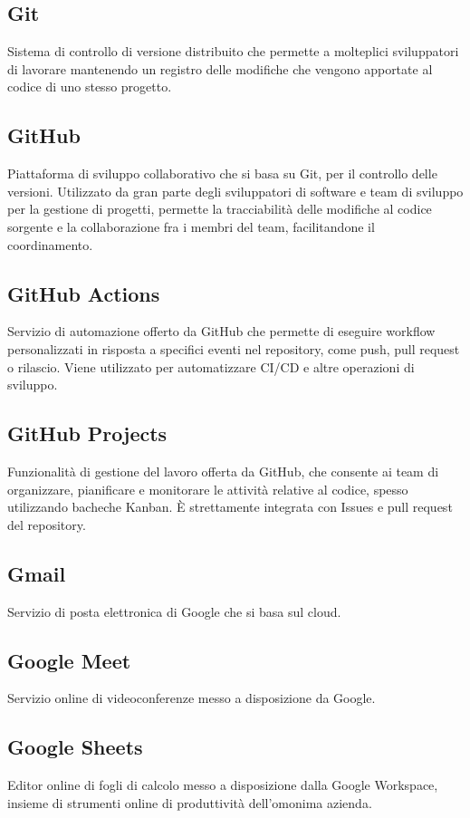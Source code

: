 \documentclass[10pt, letterpaper]{article}
\begin{document}
\subsection*{Git}
Sistema di controllo di versione distribuito che permette a molteplici sviluppatori di lavorare mantenendo un registro delle modifiche che vengono apportate al
codice di uno stesso progetto.

\subsection*{GitHub}
Piattaforma di sviluppo collaborativo che si basa su Git, per il controllo delle versioni. Utilizzato da gran parte degli sviluppatori di software e team di
sviluppo per la gestione di progetti, permette la tracciabilità delle modifiche al codice sorgente e la collaborazione fra i membri del team, facilitandone
il coordinamento.

\subsection*{GitHub Actions}
Servizio di automazione offerto da GitHub che permette di eseguire workflow personalizzati
in risposta a specifici eventi nel repository, come push, pull request o rilascio. Viene utilizzato per automatizzare CI/CD e altre operazioni di sviluppo.

\subsection*{GitHub Projects}
Funzionalità di gestione del lavoro offerta da GitHub, che consente ai team di organizzare, pianificare e monitorare le attività relative al codice, spesso
utilizzando bacheche Kanban. È strettamente integrata con Issues e pull request del repository.

\subsection*{Gmail}
Servizio di posta elettronica di Google che si basa sul cloud.

\subsection*{Google Meet}
Servizio online di videoconferenze messo a disposizione da Google.

\subsection*{Google Sheets}
Editor online di fogli di calcolo messo a disposizione dalla Google Workspace, insieme di strumenti online di produttività dell'omonima azienda.
\end{document}
